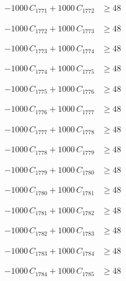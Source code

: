 \documentclass[a4paper,11pt]{article}
\begin{document}
\begin{align}
-1000\,C_{1771} + 1000\,C_{1772} &\geq 48 \nonumber
\end{align}

\begin{align}
-1000\,C_{1772} + 1000\,C_{1773} &\geq 48 \nonumber
\end{align}

\begin{align}
-1000\,C_{1773} + 1000\,C_{1774} &\geq 48 \nonumber
\end{align}

\begin{align}
-1000\,C_{1774} + 1000\,C_{1775} &\geq 48 \nonumber
\end{align}

\begin{align}
-1000\,C_{1775} + 1000\,C_{1776} &\geq 48 \nonumber
\end{align}

\begin{align}
-1000\,C_{1776} + 1000\,C_{1777} &\geq 48 \nonumber
\end{align}

\begin{align}
-1000\,C_{1777} + 1000\,C_{1778} &\geq 48 \nonumber
\end{align}

\begin{align}
-1000\,C_{1778} + 1000\,C_{1779} &\geq 48 \nonumber
\end{align}

\begin{align}
-1000\,C_{1779} + 1000\,C_{1780} &\geq 48 \nonumber
\end{align}

\begin{align}
-1000\,C_{1780} + 1000\,C_{1781} &\geq 48 \nonumber
\end{align}

\begin{align}
-1000\,C_{1781} + 1000\,C_{1782} &\geq 48 \nonumber
\end{align}

\begin{align}
-1000\,C_{1782} + 1000\,C_{1783} &\geq 48 \nonumber
\end{align}

\begin{align}
-1000\,C_{1783} + 1000\,C_{1784} &\geq 48 \nonumber
\end{align}

\begin{align}
-1000\,C_{1784} + 1000\,C_{1785} &\geq 48 \nonumber
\end{align}
\end{document}
